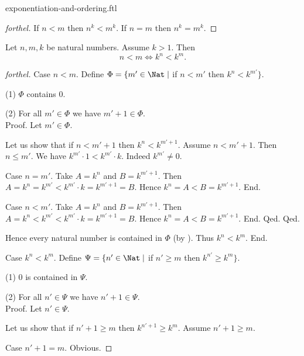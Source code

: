 \documentclass{naproche-library}
\begin{document}
\begin{smodule}{exponentiation-and-ordering.ftl}
\begin{proof}[forthel]
    If $n < m$ then $n^{k} < m^{k}$.
    If $n = m$ then $n^{k} = m^{k}$.
  \end{proof}

  \begin{proposition}[forthel,id=ARITHMETIC_09_3349764703780864]
    Let $n, m, k$ be natural numbers.
    Assume $k > 1$.
    Then \[ n < m \iff k^{n} < k^{m}. \]
  \end{proposition}
  \begin{proof}[forthel]
    Case $n < m$.
      Define $\Phi = \{ m' \in \Nat \mid$ if $n < m'$ then $k^{n} < k^{m'} \}$.

      (1) $\Phi$ contains $0$.

      (2) For all $m' \in \Phi$ we have $m' + 1 \in \Phi$. \\
      Proof.
        Let $m' \in \Phi$.

        Let us show that if $n < m' + 1$ then $k^{n} < k^{m' + 1}$.
          Assume $n < m' + 1$.
          Then $n \leq m'$.
          We have $k^{m'} \cdot 1 < k^{m'} \cdot k$.
          Indeed $k^{m'} \neq 0$.

          Case $n = m'$.
            Take $A = k^{n}$ and $B = k^{m' + 1}$. %
            Then $A
              = k^{n}
              = k^{m'}
              < k^{m'} \cdot k
              = k^{m' + 1}
              = B$.
            Hence $k^{n} = A < B = k^{m' + 1}$.
          End.

          Case $n < m'$.
            Take $A = k^{n}$ and $B = k^{m' + 1}$. %
            Then $A
              = k^{n}
              < k^{m'}
              < k^{m'} \cdot k
              = k^{m' + 1}
              = B$.
            Hence $k^{n} = A < B = k^{m' + 1}$.
          End.
        Qed.
      Qed.

      Hence every natural number is contained in $\Phi$ (by ).
      Thus $k^{n} < k^{m}$.
    End.

    Case $k^{n} < k^{m}$.
      Define $\Psi = \{ n' \in \Nat \mid$ if $n' \geq m$ then
      $k^{n'} \geq k^{m} \}$.

      (1) $0$ is contained in $\Psi$.

      (2) For all $n' \in \Psi$ we have $n' + 1 \in \Psi$. \\
      Proof.
        Let $n' \in \Psi$.

        Let us show that if $n' + 1 \geq m$ then $k^{n' + 1} \geq k^{m}$.
          Assume $n' + 1 \geq m$.

          Case $n' + 1 = m$. Obvious.


\end{proof}
\end{smodule}
\end{document}
